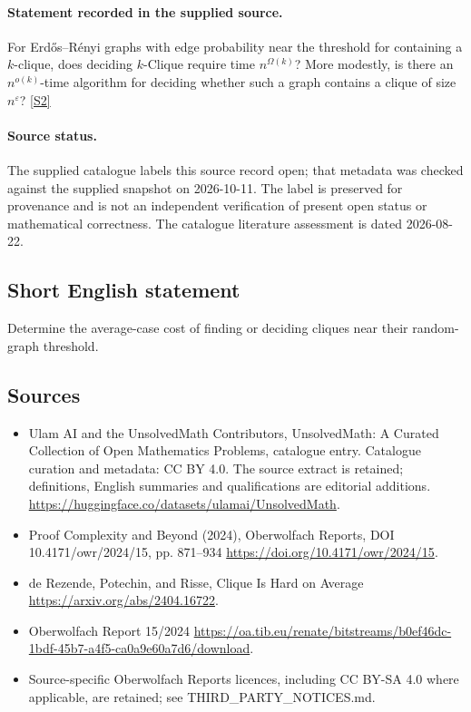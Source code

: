 \documentclass[11pt]{article}
\begin{document}
\paragraph{Statement recorded in the supplied source.}
For Erdős–Rényi graphs with edge probability near the threshold for containing a $k$-clique, does deciding $k$-Clique require time $n^{\Omega(k)}$? More modestly, is there an $n^{o(k)}$-time algorithm for deciding whether such a graph contains a clique of size $n^\varepsilon$? \href{https://doi.org/10.4171/owr/2024/15}{[S2]}
\paragraph{Source status.}
The supplied catalogue labels this source record open; that metadata was checked against the supplied snapshot on 2026-10-11. The label is preserved for provenance and is not an independent verification of present open status or mathematical correctness. The catalogue literature assessment is dated 2026-08-22.
\subsection{Short English statement}
Determine the average-case cost of finding or deciding cliques near their random-graph threshold.
\subsection{Sources}
\begin{itemize}
\item[S1] Ulam AI and the UnsolvedMath Contributors, UnsolvedMath: A Curated Collection of Open Mathematics Problems, catalogue entry. Catalogue curation and metadata: CC BY 4.0. The source extract is retained; definitions, English summaries and qualifications are editorial additions.
\url{https://huggingface.co/datasets/ulamai/UnsolvedMath}.
\item[S2] Proof Complexity and Beyond (2024), Oberwolfach Reports, DOI 10.4171/owr/2024/15, pp. 871--934
\url{https://doi.org/10.4171/owr/2024/15}.
\item[S3] de Rezende, Potechin, and Risse, Clique Is Hard on Average
\url{https://arxiv.org/abs/2404.16722}.
\item[S4] Oberwolfach Report 15/2024
\url{https://oa.tib.eu/renate/bitstreams/b0ef46dc-1bdf-45b7-a4f5-ca0a9e60a7d6/download}.
\item Source-specific Oberwolfach Reports licences, including CC BY-SA 4.0 where applicable, are retained; see THIRD\_PARTY\_NOTICES.md.
\end{itemize}
\end{document}
